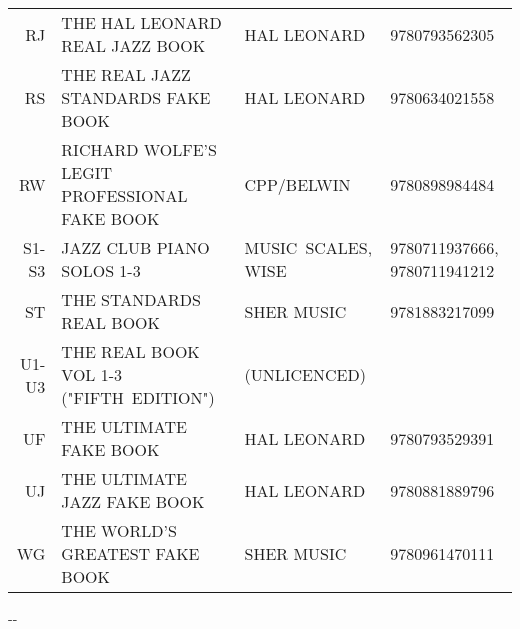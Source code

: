 \documentclass[8pt]{scrartcl}
\begin{document}
\begin{center}
\begin{tabular}{rp{}p{}p{}}
    RJ    & THE HAL LEONARD REAL JAZZ BOOK                  & HAL LEONARD        & 9780793562305 \\
    RS    & THE REAL JAZZ STANDARDS FAKE BOOK               & HAL LEONARD        & 9780634021558 \\
    RW    & RICHARD WOLFE'S LEGIT PROFESSIONAL FAKE BOOK    & CPP/BELWIN         & 9780898984484 \\
    S1-S3 & JAZZ CLUB PIANO SOLOS 1-3                       & MUSIC~SCALES, WISE & 9780711937666, 9780711941212 \\
    ST    & THE STANDARDS REAL BOOK                         & SHER MUSIC         & 9781883217099 \\
    U1-U3 & THE REAL BOOK VOL 1-3 ("FIFTH~EDITION")         & (UNLICENCED)       & \\
    UF    & THE ULTIMATE FAKE BOOK                          & HAL LEONARD        & 9780793529391 \\
    UJ    & THE ULTIMATE JAZZ FAKE BOOK                     & HAL LEONARD        & 9780881889796 \\
    WG    & THE WORLD'S GREATEST FAKE BOOK                  & SHER MUSIC         & 9780961470111 \\
  \end{tabular}
\end{center}

\begin{multicols}{3}
  \raggedright
  
  \begin{center}
    \the\year-\the\month-\the\day
  \end{center}
\end{multicols}
\end{document}
